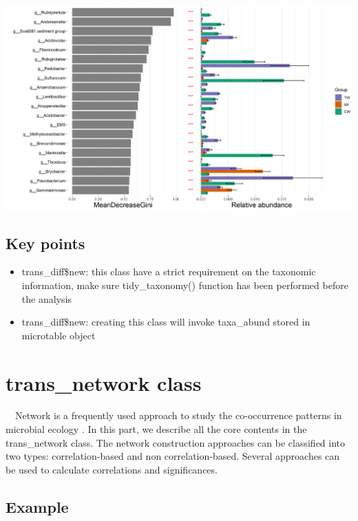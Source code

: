 \documentclass[
]{book}
\providecommand{\tightlist}{%
  \setlength{\itemsep}{0pt}\setlength{\parskip}{0pt}}
\begin{document}
\begin{center}\includegraphics[width=800px]{Images/plot_diff_abund} \end{center}

\hypertarget{key-points-5}{%
\subsection{Key points}\label{key-points-5}}

\begin{itemize}
\tightlist
\item
  trans\_diff\$new: this class have a strict requirement on the taxonomic information, make sure tidy\_taxonomy() function has been performed before the analysis
\item
  trans\_diff\$new: creating this class will invoke taxa\_abund stored in microtable object
\end{itemize}

\hypertarget{trans_network-class}{%
\section{trans\_network class}\label{trans_network-class}}

　Network is a frequently used approach to study the co-occurrence patterns in microbial ecology \citep{Deng_Molecular_2012, Faust_Microbial_2012, Coyte_Theecology_2015}.
In this part, we describe all the core contents in the trans\_network class.
The network construction approaches can be classified into two types: correlation-based and non correlation-based.
Several approaches can be used to calculate correlations and significances.

\hypertarget{example-6}{%
\subsection{Example}\label{example-6}}
\end{document}
